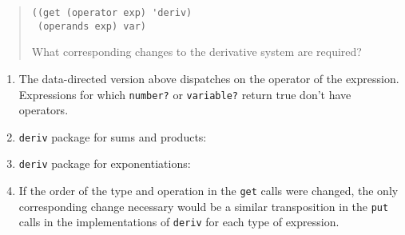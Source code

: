 \documentclass{article}
\begin{document}
\begin{quote}
\begin{enumerate}
            \begin{lstlisting}
((get (operator exp) 'deriv)
 (operands exp) var)
            \end{lstlisting}

            What corresponding changes to the derivative system are required?
    \end{enumerate}
\end{quote}

\begin{enumerate}
    \item The data-directed version above dispatches on the operator of the
        expression. Expressions for which \texttt{number?} or \texttt{variable?}
        return true don't have operators.
    \item \texttt{deriv} package for sums and products:
        
    \item \texttt{deriv} package for exponentiations:
        
    \item If the order of the type and operation in the \texttt{get} calls were
        changed, the only corresponding change necessary would be a similar
        transposition in the \texttt{put} calls in the implementations of
        \texttt{deriv} for each type of expression.
\end{enumerate}
\end{document}
